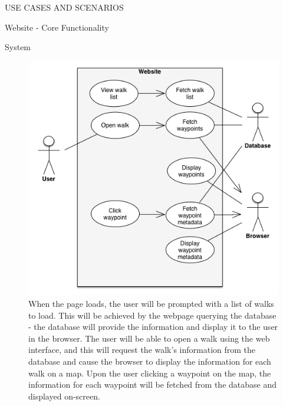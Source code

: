 \documentclass{article}
\begin{document}
\begin{section}{USE CASES AND SCENARIOS}
		\clearpage
		\begin{subsection}{Website - Core Functionality}
			\begin{subsubsection}{System}
				\begin{figure}[h!]
					\begin{center}
						\includegraphics[height=0.75\columnwidth]{./Diagrams/UseCase/Website/Core/Website.png}
					\end{center}
					\caption{When the page loads, the user will be prompted with a list of walks to load. This will be achieved by the webpage querying the database - the database will provide the information and display it to the user in the browser. The user will be able to open a walk using the web interface, and this will request the walk's information from the database and cause the browser to display the information for each walk on a map. Upon the user clicking a waypoint on the map, the information for each waypoint will be fetched from the database and displayed on-screen.}
				\end{figure}
			\end{subsubsection}
		\end{subsection}
		

\end{section}
\end{document}

